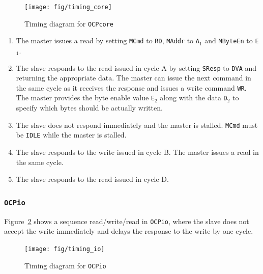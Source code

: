 \documentclass[a4paper,fontsize=10pt,twoside,DIV15,BCOR12mm,headinclude=true,footinclude=false,pagesize,bibtotoc]{scrbook}
\newcommand{\code}[1]{{\texttt{#1}}}
\begin{document}
\begin{figure}
\centering
\texttt{[image: fig/timing\_core]}
\caption{Timing diagram for \code{OCPcore}}
\label{fig:timing_core}
\end{figure}

\begin{enumerate}[A:]
\item The master issues a read by setting \code{MCmd} to \code{RD},
  \code{MAddr} to \code{A$_1$} and \code{MByteEn} to \code{E$_1$}.
\item The slave responds to the read issued in cycle A by setting
  \code{SResp} to \code{DVA} and returning the appropriate data. The
  master can issue the next command in the same cycle as it receives
  the response and issues a write command \code{WR}. The
  master provides the byte enable value \code{E$_2$} along with the
  data \code{D$_2$} to specify which bytes should be actually written.
\item The slave does not respond immediately and the master is
  stalled. \code{MCmd} must be \code{IDLE} while the master is
  stalled.
\item The slave responds to the write issued in cycle B. The master
  issues a read in the same cycle.
\item The slave responds to the read issued in cycle D.
\end{enumerate}

\clearpage
\subsubsection{\code{OCPio}}

Figure~\ref{fig:timing_io} shows a sequence read/write/read in
\code{OCPio}, where the slave does not accept the write immediately
and delays the response to the write by one cycle.

\begin{figure}
\centering
\texttt{[image: fig/timing\_io]}
\caption{Timing diagram for \code{OCPio}}
\label{fig:timing_io}
\end{figure}
\end{document}
